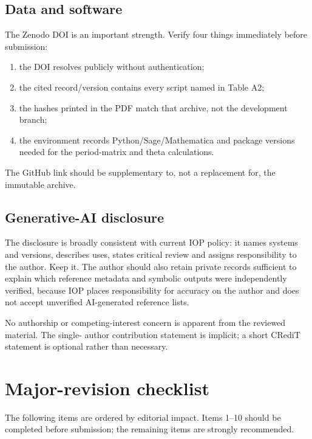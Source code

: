 \documentclass[11pt,a4paper]{article}
\begin{document}
\subsection{Data and software}

The Zenodo DOI is an important strength.  Verify four things immediately before submission:

\begin{enumerate}
  \item the DOI resolves publicly without authentication;
  \item the cited record/version contains every script named in Table A2;
  \item the hashes printed in the PDF match that archive, not the development branch;
  \item the environment records Python/Sage/Mathematica and package versions needed for the
  period-matrix and theta calculations.
\end{enumerate}

The GitHub link should be supplementary to, not a replacement for, the immutable archive.

\subsection{Generative-AI disclosure}

The disclosure is broadly consistent with current IOP policy: it names systems and versions,
describes uses, states critical review and assigns responsibility to the author.  Keep it.  The
author should also retain private records sufficient to explain which reference metadata and
symbolic outputs were independently verified, because IOP places responsibility for accuracy on
the author and does not accept unverified AI-generated reference lists.

No authorship or competing-interest concern is apparent from the reviewed material.  The single-
author contribution statement is implicit; a short CRediT statement is optional rather than
necessary.

\section{Major-revision checklist}

The following items are ordered by editorial impact.  Items 1--10 should be completed before
submission; the remaining items are strongly recommended.
\end{document}
